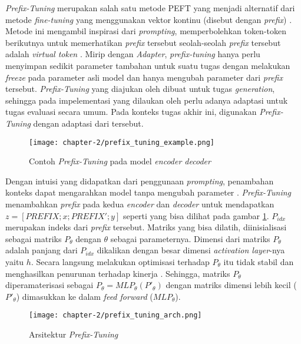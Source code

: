 \textit{Prefix-Tuning} merupakan salah satu metode PEFT yang menjadi alternatif dari metode \textit{fine-tuning} yang menggunakan vektor kontinu (disebut dengan \textit{prefix}) \parencite{prefix_tuning}. Metode ini mengambil inspirasi dari \textit{prompting}, memperbolehkan token-token berikutnya untuk memerhatikan \textit{prefix} tersebut seolah-seolah \textit{prefix} tersebut adalah \textit{virtual token} \parencite{prefix_tuning}. Mirip dengan \textit{Adapter}, \textit{prefix-tuning} hanya perlu menyimpan sedikit parameter tambahan untuk suatu tugas dengan melakukan \textit{freeze} pada parameter asli model dan hanya mengubah parameter dari \textit{prefix} tersebut. \textit{Prefix-Tuning} yang diajukan oleh \citeauthor{prefix_tuning} dibuat untuk tugas \textit{generation}, sehingga pada impelementasi yang dilaukan oleh \citeauthor{adapters} perlu adanya adaptasi untuk tugas evaluasi secara umum. Pada konteks tugas akhir ini, digunakan \textit{Prefix-Tuning} dengan adaptasi dari \citeauthor{adapters} tersebut. 

\begin{figure}[h]
    \vspace{0.25cm}
    \centering
    \texttt{[image: chapter-2/prefix\_tuning\_example.png]}
    \caption{Contoh \textit{Prefix-Tuning} pada model \textit{encoder decoder} \parencite{prefix_tuning}}
    \label{fig:prefix_tuning_example}
\end{figure}

Dengan intuisi yang didapatkan dari penggunaan \textit{prompting}, penambahan konteks dapat mengarahkan model tanpa mengubah parameter \parencite{prefix_tuning}. \textit{Prefix-Tuning} menambahkan \textit{prefix} pada kedua \textit{encoder} dan \textit{decoder} untuk mendapatkan $z = [PREFIX;x;PREFIX';y]$ seperti yang bisa dilihat pada gambar \ref{fig:prefix_tuning_example}. $P_{idx}$ merupakan indeks dari \textit{prefix} tersebut. Matriks yang bisa dilatih, diinisialisasi sebagai matriks $P_\theta$ dengan $\theta$ sebagai parameternya. Dimensi dari matriks $P_\theta$ adalah panjang dari $P_{idx}$ dikalikan dengan besar dimensi \textit{activation layer}-nya yaitu $h$. Secara langsung melakukan optimisasi terhadap $P_\theta$ itu tidak stabil dan menghasilkan penurunan terhadap kinerja \parencite{prefix_tuning}. Sehingga, matriks $P_\theta$ diperamaterisasi sebagai $P_\theta = MLP_\theta(P'_\theta)$ dengan matriks dimensi lebih kecil ($P'_\theta$) dimasukkan ke dalam \textit{feed forward} ($MLP_\theta$).

\begin{figure}[h]
    \vspace{0.25cm}
    \centering
    \texttt{[image: chapter-2/prefix\_tuning\_arch.png]}
    \caption{Arsitektur \textit{Prefix-Tuning} \parencite{adapterhub}}
    \label{fig:prefix_tuning_arch}
\end{figure}

